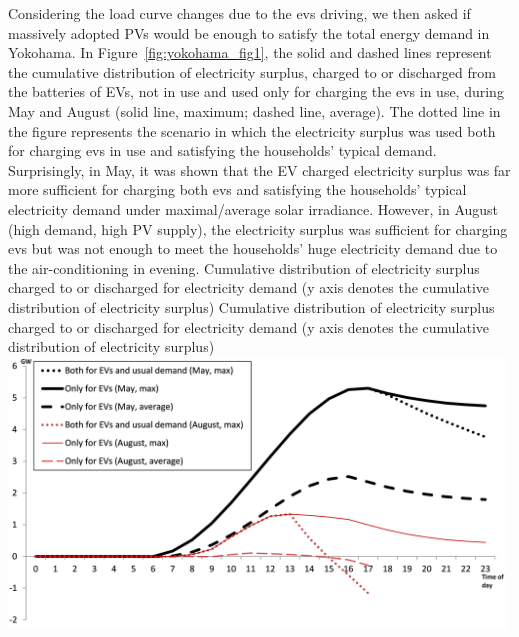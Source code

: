 Considering the load curve changes due to the \glspl{ev} driving, we then asked if massively adopted PVs would be enough to satisfy the total energy demand in Yokohama. In Figure~\ref{fig:yokohama_fig1}, the solid and dashed lines represent the cumulative distribution of electricity surplus, charged to or discharged from the batteries of EVs, not in use and used only for charging the \glspl{ev} in use, during May and August (solid line, maximum; dashed line, average). The dotted line in the figure represents the scenario in which the electricity surplus was used both for charging \glspl{ev} in use and satisfying the households' typical demand. Surprisingly, in May, it was shown that the EV charged electricity surplus was far more sufficient for charging both \glspl{ev} and satisfying the households' typical electricity demand under maximal/average solar irradiance. However, in August (high demand, high PV supply), the electricity surplus was sufficient for charging \glspl{ev} but was not enough to meet the households' huge electricity demand due to the air-conditioning in evening. 
%
\createfigure%
{Cumulative distribution of electricity surplus charged to or discharged for electricity demand (y axis denotes the cumulative distribution of electricity surplus)}%
{Cumulative distribution of electricity surplus charged to or discharged for electricity demand (y axis denotes the cumulative distribution of electricity surplus)}%
{\label{fig:yokohama_fig1}}%
{\includegraphics[width=0.99\textwidth, angle=0]{./scenarios/figures/yokohama_fig1.png}}%
{}

